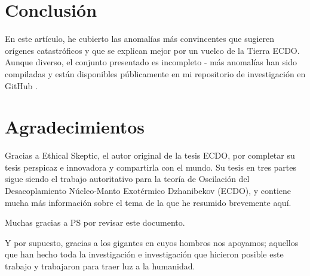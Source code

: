 \documentclass[10pt,twocolumn,letterpaper]{article}
\begin{document}
\section{Conclusión}

En este artículo, he cubierto las anomalías más convincentes que sugieren orígenes catastróficos y que se explican mejor por un vuelco de la Tierra ECDO. Aunque diverso, el conjunto presentado es incompleto - más anomalías han sido compiladas y están disponibles públicamente en mi repositorio de investigación en GitHub \cite{2}.

\section{Agradecimientos}

Gracias a Ethical Skeptic, el autor original de la tesis ECDO, por completar su tesis perspicaz e innovadora y compartirla con el mundo. Su tesis en tres partes \cite{1} sigue siendo el trabajo autoritativo para la teoría de Oscilación del Desacoplamiento Núcleo-Manto Exotérmico Dzhanibekov (ECDO), y contiene mucha más información sobre el tema de la que he resumido brevemente aquí.

Muchas gracias a PS por revisar este documento.

Y por supuesto, gracias a los gigantes en cuyos hombros nos apoyamos; aquellos que han hecho toda la investigación e investigación que hicieron posible este trabajo y trabajaron para traer luz a la humanidad.

{\small


}
\end{document}
